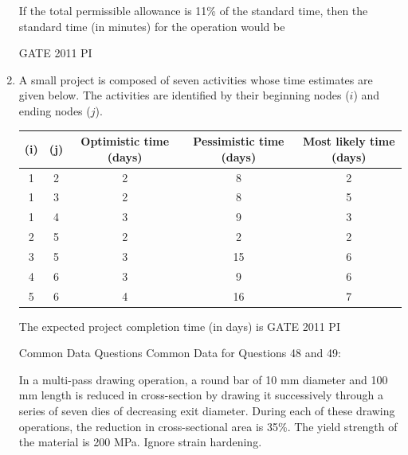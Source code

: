 \documentclass[journal,12pt,onecolumn]{IEEEtran}
\theoremstyle{remark}
\begin{document}
\begin{enumerate}
If the total permissible allowance is 11\% of the standard time, then the standard time (in minutes) for the operation would be

\hfill{GATE 2011 PI}
\begin{enumerate}
\end{enumerate}
\item A small project is composed of seven activities whose time estimates are given below. The activities are identified by their beginning nodes ($i$) and ending nodes ($j$).

\begin{tabular}{|c|c|c|c|c|}
    \hline
    (i) & (j) & \textbf{Optimistic time} (days) & \textbf{Pessimistic time} (days) & \textbf{Most likely time} (days) \\
    \hline
    1 & 2 & 2 & 8 & 2 \\
    1 & 3 & 2 & 8 & 5 \\
    1 & 4 & 3 & 9 & 3 \\
    2 & 5 & 2 & 2 & 2 \\
    3 & 5 & 3 & 15 & 6 \\
    4 & 6 & 3 & 9 & 6 \\
    5 & 6 & 4 & 16 & 7 \\
    \hline
\end{tabular}

The expected project completion time (in days) is
\hfill{GATE 2011 PI}
\begin{enumerate}
\end{enumerate}
Common Data Questions
Common Data for Questions 48 and 49:

In a multi-pass drawing operation, a round bar of 10 mm diameter and 100 mm length is reduced in cross-section by drawing it successively through a series of seven dies of decreasing exit diameter. During each of these drawing operations, the reduction in cross-sectional area is 35\%. The yield strength of the material is 200 MPa. Ignore strain hardening.


\end{enumerate}
\end{document}
